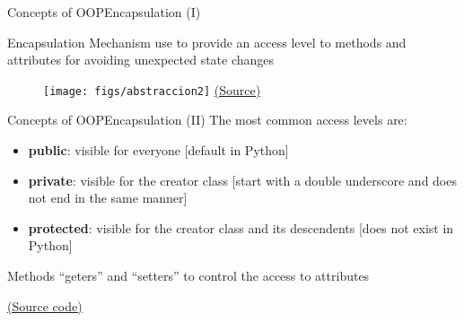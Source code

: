 \documentclass[10pt,compress]{beamer} %
\begin{document}
\begin{frame}{Concepts of OOP}{Encapsulation (I)}
	\begin{block}{Encapsulation}
		Mechanism use to provide an access level to methods and attributes for avoiding unexpected state changes
  	\end{block}	

	\begin{figure}
		\texttt{[image: figs/abstraccion2]}
		\scriptsize \href{http://www.onlinebuff.com}{(Source)}
	\end{figure}
\end{frame}

\begin{frame}{Concepts of OOP}{Encapsulation (II)}
    The most common access levels are:
	
	\begin{itemize}
		\item \textbf{public}: visible for everyone  [default in Python]
		\item \textbf{private}: visible for the creator class [start with a double underscore and does not end in the same manner]
		\item \textbf{protected}: visible for the creator class and its descendents \alert{[does not exist in Python]}
	\end{itemize}

     Methods ``geters'' and ``setters'' to control the access to attributes
\end{frame}

\begin{frame}[plain]%
	\begin{exampleblock}{}
	\vspace{-0.3cm} 
		
	\end{exampleblock}

	\href{https://gist.github.com/dfbarrero/a6ebc6632fb9fe06a2c8c6a47a465ab5}{(Source code)}
\end{frame}
\end{document}
